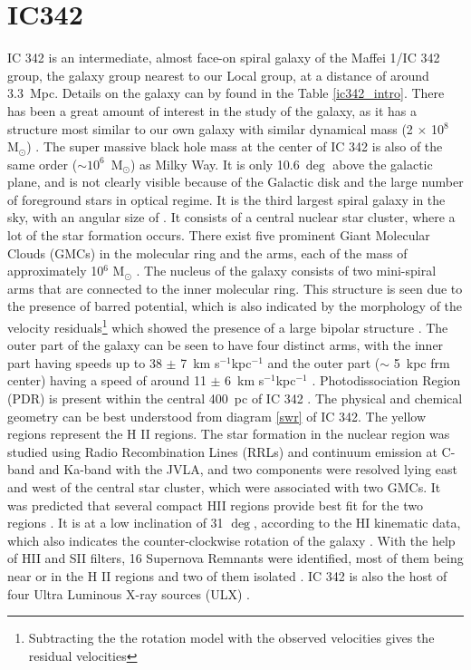 \documentclass[../main/thesis_msc.tex]{subfiles}
\begin{document}
\section{IC342}
IC 342 is an intermediate, almost face-on spiral galaxy of the Maffei 1/IC 342 group, the galaxy group nearest to our Local group, at a distance of around 3.3~Mpc\citep{distance_ic342}. Details on the galaxy can by found in the Table \ref{ic342_intro}. There has been a great amount of interest in the study of the galaxy, as it has a structure most similar to our own galaxy with similar dynamical mass (2 $\times$ 10$^8$ M$_\odot$) \citep{dyn_mas}. The super massive black hole mass at the center of IC 342 is also of the same order ($\sim 10^6$~M$_\odot$) as Milky Way. It is only 10.6$~\deg$ above the galactic plane, and is not clearly visible because of the Galactic disk and the large number of foreground stars in optical regime. It is the third largest spiral galaxy in the sky, with an angular size of . It consists of a central nuclear star cluster, where a lot of the star formation occurs. There exist five prominent Giant Molecular Clouds (GMCs) in the molecular ring and the arms, each of the mass of approximately 10$^6$ M$_{\odot}$ \citep{ic342_2}. The nucleus of the galaxy consists of two mini-spiral arms that are connected to the inner molecular ring. This structure is seen due to the presence of barred potential, which is also indicated by the morphology of the velocity residuals\footnote{Subtracting the the rotation model with the observed velocities gives the residual velocities} which showed the presence of a large bipolar structure \citep{H1}. The outer part of the galaxy can be seen to have four distinct arms, with the inner part having speeds up to 38 $\pm$ 7~km s$^{-1}$kpc$^{-1}$ and the outer part ($\sim$ 5~kpc frm center) having a speed of around 11 $\pm$ 6~km s$^{-1}$kpc$^{-1}$ \citep{arms}. Photodissociation Region (PDR) is present within the central 400~pc of IC 342 \citep{ic342_1}. The physical and chemical geometry can be best understood from diagram \ref{swr} of IC 342. The yellow regions represent the H II regions. The star formation in the nuclear region was studied using Radio Recombination Lines (RRLs) and continuum emission at C- band and Ka-band with the JVLA, and two components were resolved lying east and west of the central star cluster, which were associated with two GMCs. It was predicted that several compact HII regions provide best fit for the two regions \citep{ic342_3}. It is at a low inclination of 31 $\deg$, according to the HI kinematic data, which also indicates the counter-clockwise rotation of the galaxy \citep{H1}. With the help of HII and SII filters, 16 Supernova Remnants were identified, most of them being near or in the H II regions and two of them isolated \citep{snr}. IC 342 is also the host of four Ultra Luminous X-ray sources (ULX) \citep{ulx}. 
\end{document}
